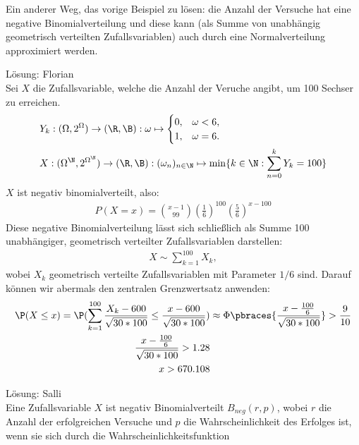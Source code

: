\begin{exercise}

Ein anderer Weg, das vorige Beispiel zu lösen: die Anzahl der Versuche hat eine negative Binomialverteilung und diese kann (als Summe von unabhängig geometrisch verteilten Zufallsvariablen) auch durch eine Normalverteilung approximiert werden.

\end{exercise}

\begin{solution}

Lösung: Florian \\
Sei $X$ die Zufallsvariable, welche die Anzahl der Veruche angibt, um 100 Sechser zu erreichen.
\begin{align*}
&Y_k:(\Omega,2^\Omega) \to (\R,\B): \omega \mapsto
\begin{cases}
    0, & \omega < 6, \\
    1, & \omega = 6.
\end{cases} \\
    &X:(\Omega^\N,2^{\Omega^\N}) \to (\R, \B): (\omega_n)_{n\in\N} \mapsto \min\{k\in\N: \sum_{n = 0}^kY_k = 100\}
\end{align*}
$X$ ist negativ binomialverteilt, also:
\begin{align*}
  P(X=x) = {x - 1\choose 99}(\frac{1}{6})^{100}(\frac{5}{6})^{x-100}
\end{align*}
Diese negative Binomialverteilung lässt sich schließlich als Summe 100 unabhängiger, geometrisch verteilter Zufallsvariablen darstellen:
\begin{align*}
  X \sim \sum_{k=1}^{100}X_k,
\end{align*}
wobei $X_k$ geometrisch verteilte Zufallsvariablen mit Parameter $1/6$ sind.
Darauf können wir abermals den zentralen Grenzwertsatz anwenden:
\begin{align*}
  \P(X \leq x) = \P(\sum_{k=1}^{100}\frac{X_k - 600}{\sqrt{30*100}} \leq \frac{x-600}{\sqrt{30*100}}) &\approx \Phi\pbraces{\frac{x-\frac{100}{6}}{\sqrt{30*100}}}  > \frac{9}{10} \\
  \frac{x-\frac{100}{6}}{\sqrt{30*100}} > 1.28 \\
  x > 670.108
\end{align*}

Lösung: Salli \\
Eine Zufallsvariable $X$ ist negativ Binomialverteilt $B_{neg} (r,p)$, wobei
$r$ die Anzahl der erfolgreichen Versuche und $p$ die Wahrscheinlichkeit
des Erfolges ist, wenn sie sich durch die Wahrscheinlichkeitsfunktion


\end{solution}
